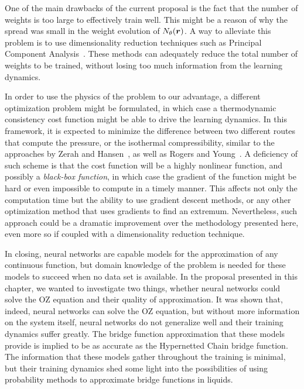 One of the main drawbacks of the current proposal is the fact that the number of weights
is too large to effectively train well. This might be a reason of why the spread was
small in the weight evolution of $N_{\theta}(\bm{r})$. A way to alleviate this problem is to use
dimensionality reduction techniques such as
Principal Component Analysis~\cite{hastieElementsStatisticalLearning2009}. 
These methods can adequately reduce the total number of weights to be trained, without 
losing too much information from the learning dynamics.

In order to use the physics of the problem to our advantage, a different optimization
problem might be formulated, in which case a thermodynamic consistency cost function
might be able to drive the learning dynamics. In this framework, it is expected to minimize 
the difference between two different routes that compute the pressure, or the isothermal
compressibility, similar to the approaches by Zerah and Hansen~\cite{zerahSelfConsistentIntegral1986}, 
as well as Rogers and Young~\cite{rogersNewThermodynamicallyConsistent1984b}.
A deficiency of such scheme is that the cost function will be
a highly nonlinear function, and possibly a \emph{black-box function}, in which case
the gradient of the function might be hard or even impossible to compute in a timely manner.
This affects not only the computation time but the ability to use gradient descent methods,
or any other optimization method that uses gradients to find an extremum.
Nevertheless, such approach could be a dramatic improvement over the methodology presented
here, even more so if coupled with a dimensionality reduction technique.

In closing, neural networks are capable models for the approximation of any continuous function, 
but domain knowledge of the problem is needed for these models to succeed when no data set 
is available. In the proposal presented in this chapter, we wanted to investigate two things, 
whether neural networks could solve the OZ equation and their quality of approximation. 
It was shown that, indeed, neural networks can solve the OZ equation, but without more 
information on the system itself, neural networks do not generalize well and their training 
dynamics suffer greatly. The bridge function approximation that these models provide is
implied to be as accurate as the Hypernetted Chain bridge function.
The information that these models gather throughout the training 
is minimal, but their training dynamics shed some light into the possibilities of using 
probability methods to approximate bridge functions in liquids.